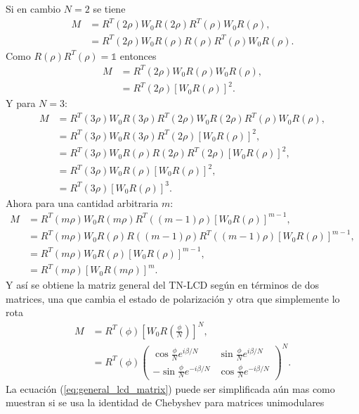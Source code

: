 Si en cambio $N=2$ se tiene
\begin{align*}
  M &= R^T(2\rho)W_0R(2\rho)R^T(\rho)W_0R(\rho),\\
      &=R^T(2\rho)W_0R(\rho)R(\rho)R^T(\rho)W_0R(\rho).
\end{align*}
Como $R(\rho)R^T(\rho)=\mathds{1}$ entonces
\begin{align*}
 M &= R^T(2\rho)W_0R(\rho)W_0R(\rho),\\
     &=R^T(2\rho)\left[W_0R(\rho)\right]^2.
\end{align*}
Y para $N=3$:
\begin{align*}
  M &= R^T(3\rho)W_0R(3\rho)R^T(2\rho)W_0R(2\rho)R^T(\rho)W_0R(\rho),\\
      &=R^T(3\rho)W_0R(3\rho)R^T(2\rho)\left[W_0R(\rho)\right]^2,\\
      &=R^T(3\rho)W_0R(\rho)R(2\rho)R^T(2\rho)\left[W_0R(\rho)\right]^2,\\
      &=R^T(3\rho)W_0R(\rho)\left[W_0R(\rho)\right]^2,\\
      &=R^T(3\rho)\left[W_0R(\rho)\right]^3.
\end{align*}
Ahora para una cantidad arbitraria $m$:
\begin{align*}
  M &= R^T(m\rho)W_0R(m\rho)R^T((m-1)\rho)\left[W_0R(\rho)\right]^{m-1},\\
      &=R^T(m\rho)W_0R(\rho)R((m-1)\rho)R^T((m-1)\rho)\left[W_0R(\rho)\right]^{m-1},\\  
      &=R^T(m\rho)W_0R(\rho)\left[W_0R(\rho)\right]^{m-1},\\
      &=R^T(m\rho)\left[W_0R(m\rho)\right]^{m}.
\end{align*}
Y así se obtiene la matriz general del TN-LCD según  en
términos de dos matrices, una que cambia el estado de polarización y
otra que simplemente lo rota
\begin{align}
M&=R^T\left( \phi\right)
\left[W_0R\left(\frac{\phi}{N}\right)\right]^N,\\
&=R^T\left( \phi\right)
\begin{pmatrix}
  \cos{\frac{\phi}{N}e^{i\beta/N}} &  \sin{\frac{\phi}{N}e^{i\beta/N}}\\
  -\sin{\frac{\phi}{N}e^{-i\beta/N}} &  \cos{\frac{\phi}{N}e^{-i\beta/N}}  
\end{pmatrix}^N.
\label{eq:general_lcd_matrix}
\end{align}
La ecuación (\ref{eq:general_lcd_matrix}) puede ser simplificada aún
mas como muestran  si se usa la identidad de Chebyshev
para matrices unimodulares  

